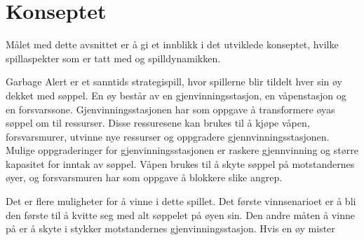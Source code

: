 \section{Konseptet}
Målet med dette avsnittet er å gi et innblikk i det utviklede konseptet,
hvilke spillaspekter som er tatt med og spilldynamikken.

Garbage Alert er et sanntids strategispill, hvor spillerne blir tildelt hver sin øy dekket med søppel. En øy består av en gjenvinningsstasjon, en våpenstasjon og en forsvarssone. Gjenvinningsstasjonen har som oppgave å transformere øyas søppel om til ressurser. Disse ressuresene kan brukes til å kjøpe våpen, forsvarsmurer, utvinne nye ressurser og oppgradere gjennvinningsstasjonen. Mulige oppgraderinger for gjenvinningsstasjonen er raskere gjennvinning og større kapasitet for inntak av søppel. Våpen brukes til å skyte søppel på motstandernes øyer, og forsvarsmuren har som oppgave å blokkere slike angrep. 

Det er flere muligheter for å vinne i dette spillet. Det første vinnsenarioet er å bli den første til å kvitte seg med alt søppelet på øyen sin. Den andre måten å vinne på er å skyte i stykker motstandernes gjenvinningsstasjon. Hvis en øy mister  
